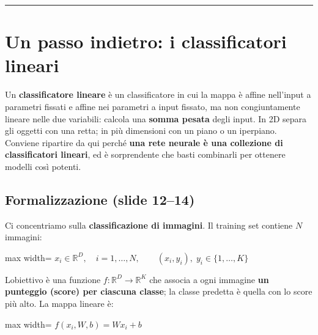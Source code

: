 \documentclass[11pt,a4paper,oneside,openany]{book}
\begin{document}
\begin{center}\rule{0.5\linewidth}{0.5pt}\end{center}

\section{Un passo indietro: i classificatori lineari}\label{f01-r108}

Un \textbf{classificatore lineare} è un classificatore in cui la mappa è affine nell'input a parametri fissati e affine nei parametri a input fissato, ma non congiuntamente lineare nelle due variabili: calcola una \textbf{somma pesata} degli input. In 2D separa gli oggetti con una retta; in più dimensioni con un piano o un iperpiano. Conviene ripartire da qui perché \textbf{una rete neurale è una collezione di classificatori lineari}, ed è sorprendente che basti combinarli per ottenere modelli così potenti.

\subsection{Formalizzazione (slide 12--14)}\label{f01-r112}

Ci concentriamo sulla \textbf{classificazione di immagini}. Il training set contiene \(N\) immagini:

\begin{center}
\begin{adjustbox}{max width=\linewidth}
$\displaystyle 
x_i \in \mathbb{R}^D,\quad i = 1,\dots,N, \qquad (x_i, y_i),\; y_i \in \{1,\dots,K\}
$
\end{adjustbox}
\end{center}

L\textquotesingle obiettivo è una funzione \(f:\mathbb{R}^D \to \mathbb{R}^K\) che associa a ogni immagine \textbf{un punteggio (score) per ciascuna classe}; la classe predetta è quella con lo score più alto. La mappa lineare è:

\begin{center}
\begin{adjustbox}{max width=\linewidth}
$\displaystyle 
\boxed{f(x_i, W, b) = W x_i + b}
$
\end{adjustbox}
\end{center}
\end{document}
